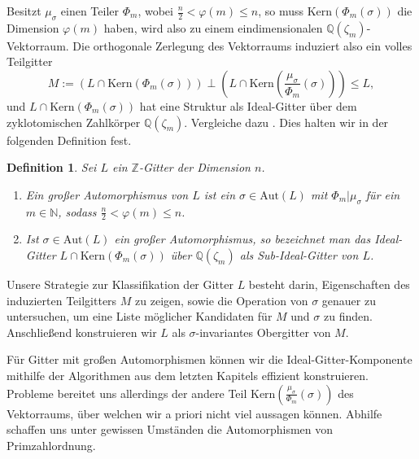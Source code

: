 \documentclass[12pt,a4paper,halfparskip,headsepline,bibtotocnumbered]{scrreprt}
\theoremstyle{nummermitklammern}
\newtheorem{definition}[defsatzusw]{Definition}
\theoremstyle{nonumberbreak}
\newcommand{\N}{\mathbb{N}}
\newcommand{\Z}{\mathbb{Z}}
\newcommand{\Q}{\mathbb{Q}}
\newcommand{\Kern}{\text{Kern}}
\newcommand{\Aut}{\text{Aut}}
\begin{document}
Besitzt $\mu_\sigma$ einen Teiler $\Phi_m$, wobei $\frac{n}{2} < \varphi(m) \leq n$, so muss $\Kern(\Phi_m(\sigma))$ die Dimension $\varphi(m)$ haben, wird also zu einem eindimensionalen $\Q(\zeta_m)$-Vektorraum. Die orthogonale Zerlegung des Vektorraums induziert also ein volles Teilgitter
\begin{equation*}
	M := \left(L \cap \Kern(\Phi_m(\sigma))\right) \perp \left(L \cap \Kern\left( \frac{\mu_\sigma}{\Phi_m} (\sigma) \right)\right) \leq L,
\end{equation*}
und $L \cap \Kern(\Phi_m(\sigma))$ hat eine Struktur als Ideal-Gitter über dem zyklotomischen Zahlkörper $\Q(\zeta_m)$. Vergleiche dazu \cite[Abs. (5.3)]{nebe}. Dies halten wir in der folgenden Definition fest.

\begin{framed}
	\begin{definition}
		Sei $L$ ein $\Z$-Gitter der Dimension $n$.
		\begin{enumerate}[label=(\roman*)]
			\item Ein \textit{großer Automorphismus} von $L$ ist ein $\sigma \in \Aut(L)$ mit $\Phi_m \vert \mu_\sigma$ für ein $m \in \N$, sodass $\frac{n}{2} < \varphi(m) \leq n$.
			\item Ist $\sigma \in \Aut(L)$ ein großer Automorphismus, so bezeichnet man das Ideal-Gitter $L \cap  \Kern(\Phi_m(\sigma))$ über $\Q(\zeta_m)$ als \textit{Sub-Ideal-Gitter} von $L$.
		\end{enumerate}
	\end{definition}
\end{framed}

Unsere Strategie zur Klassifikation der Gitter $L$ besteht darin, Eigenschaften des induzierten Teilgitters $M$ zu zeigen, sowie die Operation von $\sigma$ genauer zu untersuchen, um eine Liste möglicher Kandidaten für $M$ und $\sigma$ zu finden. Anschließend konstruieren wir $L$ als $\sigma$-invariantes Obergitter von $M$.\par
Für Gitter mit großen Automorphismen können wir die Ideal-Gitter-Komponente mithilfe der Algorithmen aus dem letzten Kapitels effizient konstruieren. Probleme bereitet uns allerdings der andere Teil $\Kern\left(\frac{\mu_\sigma}{\Phi_m}(\sigma)\right)$ des Vektorraums, über welchen wir a priori nicht viel aussagen können. Abhilfe schaffen uns unter gewissen Umständen die Automorphismen von Primzahlordnung.
\end{document}
